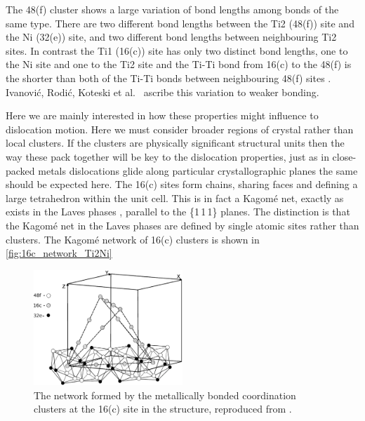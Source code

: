 The 48(f) cluster shows a large variation of bond lengths among bonds of the same type. There are two different bond lengths between the  Ti2 (48(f)) site and the Ni (32(e)) site, and two different bond lengths between neighbouring Ti2 sites. In contrast the Ti1 (16(c)) site has only two distinct bond lengths, one to the Ni site and one to the Ti2 site and the Ti-Ti bond from 16(c) to the 48(f) is the shorter than both of the Ti-Ti bonds between neighbouring 48(f) sites \cite{Yurko1959,Yurko1962,Ivanovic2006}. Ivanovi\'c, Rodi\'c, Koteski et al.\ \cite{Ivanovic2006} ascribe this variation to weaker bonding.


Here we are mainly interested in how these properties might influence to dislocation motion. Here we must consider broader regions of crystal rather than local clusters. If the clusters are physically significant structural units then the way these pack together will be key to the dislocation properties, just as in close-packed metals dislocations glide along particular crystallographic planes the same should be expected here. The 16(c) sites form chains, sharing faces and defining a large tetrahedron within the unit cell. This is in fact a Kagom\'{e} net, exactly as exists in the Laves phases \cite{Stein2004,Stein2005}, parallel to the \{1\,1\,1\} planes. The distinction is that the Kagom\'{e} net in the Laves phases are defined by single atomic sites rather than clusters. The Kagom\'{e} network of 16(c) clusters is shown in \autoref{fig:16c_network_Ti2Ni}

\begin{figure}
\centering
\includegraphics[width=0.5\textwidth]{Ti2Ni_16c_sites}
\captionsetup{width=0.6\textwidth}
\caption[The Kagom\'{e} network formed by atomic clusters around the 16(c) site.]{The network formed by the metallically bonded coordination clusters at the 16(c) site in the  structure, reproduced from \cite{Ivanovic2006}.\label{fig:16c_network_Ti2Ni}}
\end{figure}


